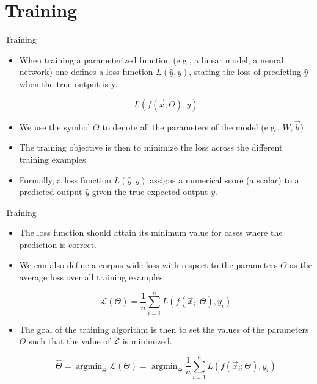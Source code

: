 \documentclass[handout]{beamer}
\begin{document}
\section{Training}



\begin{frame}{Training}
\begin{scriptsize}
\begin{itemize}
\item  When training a parameterized function (e.g., a linear model, a neural network) one defines a loss function $L(\hat{y}, y)$, stating the loss of predicting $\hat{y}$ when the true output is y.

\begin{displaymath}
L(f(\vec{x};\Theta), y) 
\end{displaymath}

\item We use the symbol $\Theta$ to denote all the parameters of the model (e.g.,  $W, \vec{b}$)

\item The training objective is then to minimize the loss across the different training examples. 


\item Formally, a loss function $L(\hat{y},y)$ assigns a numerical score (a scalar) to a predicted output $\hat{y}$ given the true expected output $y$. 

\end{itemize}
\end{scriptsize}
\end{frame}



\begin{frame}{Training}
\begin{scriptsize}
\begin{itemize}
\item The loss function should attain its minimum value for cases where the prediction is correct.

\item We can also define a corpus-wide loss with respect to the parameters $\Theta$ as the average loss over all training examples:

\begin{displaymath}
 \mathcal{L}(\Theta) = \frac{1}{n} \sum_{i=1}^n L(f(\vec{x}_i;\Theta), y_i)
\end{displaymath}

\item The goal of the training algorithm is then to set the values of the parameters $\Theta$  such that the value of $\mathcal{L}$ is minimized.


\begin{displaymath}
 \hat{\Theta} = \operatorname{argmin}_{\Theta} \mathcal{L}(\Theta) =  \operatorname{argmin}_{\Theta} \frac{1}{n} \sum_{i=1}^n L(f(\vec{x}_i;\Theta), y_i)
\end{displaymath}


\end{itemize}


\end{scriptsize}
\end{frame}
\end{document}
